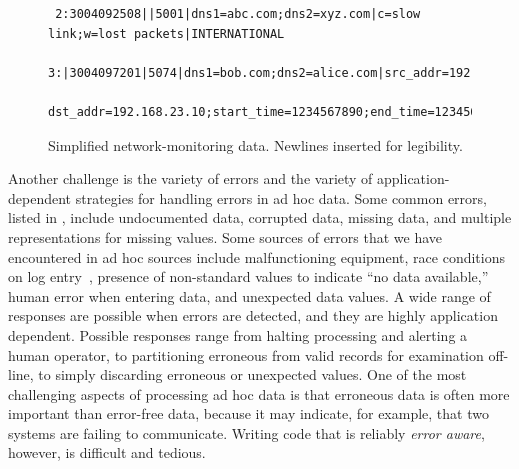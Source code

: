 \begin{figure}
  \centering
  \small
\begin{verbatim}
 2:3004092508||5001|dns1=abc.com;dns2=xyz.com|c=slow link;w=lost packets|INTERNATIONAL
 3:|3004097201|5074|dns1=bob.com;dns2=alice.com|src_addr=192.168.0.10;
 dst_addr=192.168.23.10;start_time=1234567890;end_time=1234568000;cycle_time=17412|SPECIAL
\end{verbatim}  
  \caption{Simplified network-monitoring data. Newlines 
inserted for legibility.}
  \label{fig:darkstar-records1}
\end{figure}



Another challenge is the variety of errors and the
variety of application-dependent strategies for handling errors in ad
hoc data.  Some common errors, listed in ,
include undocumented data, corrupted data, missing data, and multiple
representations for missing values.  Some sources of errors
that we have encountered in ad hoc sources include malfunctioning
equipment, race conditions on log entry~\cite{wpp}, presence of
non-standard values to indicate ``no data available,'' human error
when entering data, and unexpected data values.  A wide range of
responses are possible when errors are detected, and they are highly
application dependent.  Possible responses range from halting processing
and alerting a human operator, to partitioning erroneous from valid
records for examination off-line, to simply discarding erroneous or
unexpected values.  One of the most challenging aspects of processing
ad hoc data is that erroneous data is often more important than
error-free data, because it may indicate, for example, that two
systems are failing to communicate.  Writing code that is reliably
\emph{error aware}, however, is difficult and tedious.


